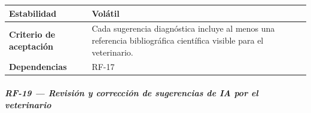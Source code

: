 \documentclass[
]{article}
\begin{document}
{\begin{longtable}[]{|
  >{\raggedright\arraybackslash}p{}|
  >{\raggedright\arraybackslash}p{}|}
\hline
\textbf{Estabilidad} & \begin{minipage}[t]{\linewidth}\raggedright
Volátil
\end{minipage} \\
\hline
\textbf{Criterio de aceptación} &
\begin{minipage}[t]{\linewidth}\raggedright
Cada sugerencia diagnóstica incluye al menos una referencia bibliográfica científica visible para el veterinario.
\end{minipage} \\
\hline
\textbf{Dependencias} & \begin{minipage}[t]{\linewidth}\raggedright
RF-17
\end{minipage} \\
\hline
\end{longtable}
}

\subparagraph{RF-19 --- Revisión y corrección de sugerencias de IA por el veterinario}\label{rf-19-revisi-n-y-correcci-n-de-sugerencias-de-}
\end{document}
